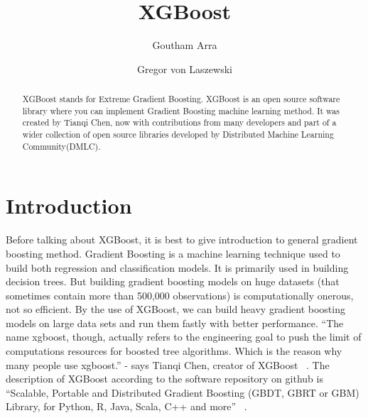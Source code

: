 
\title{XGBoost}


\author{Goutham Arra}

\author{Gregor von Laszewski}




\begin{abstract}  

XGBoost stands for Extreme Gradient Boosting. XGBoost is an open source software
library where you can  implement Gradient Boosting machine learning method. It
was created by Tianqi Chen, now with contributions from many developers and part
of a wider collection of open source libraries developed by Distributed Machine
Learning Community(DMLC).

\end{abstract}



\maketitle


\section{Introduction}  

Before talking about XGBoost, it is best to give introduction to general
gradient boosting method. Gradient Boosting is a machine learning technique used
to build both regression and classification models. It is primarily used in
building decision trees. But building gradient boosting models on huge datasets
(that sometimes contain more than 500,000 observations) is computationally
onerous, not so efficient. By the use of XGBoost, we can build  heavy gradient
boosting models on large data sets and run them fastly with better performance.
``The name xgboost, though, actually refers to the engineering goal to push the
limit of computations resources for boosted tree algorithms. Which is the reason
why many people use xgboost.'' - says Tianqi Chen, creator of XGBoost ~\cite
{hid-sp18-401-XGBoost-MLmastery}. The description of XGBoost according to the
software repository on github is ``Scalable, Portable and Distributed Gradient
Boosting (GBDT, GBRT or GBM) Library, for Python, R, Java, Scala, C++ and more''
~\cite{hid-sp18-401-XGBoost-Github}.



